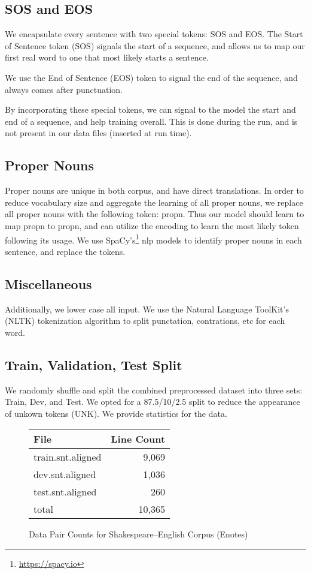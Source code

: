 \documentclass[twoside,twocolumn]{article}
\begin{document}
\subsection{SOS and EOS}
We encapsulate every sentence with two special tokens: SOS and EOS.
The Start of Sentence token (SOS) signals the start of a sequence, and allows
us to map our first real word to one that most likely starts a sentence.

We use the End of Sentence (EOS) token to signal the end of the sequence, and
always comes after punctuation.

By incorporating these special tokens, we can signal to the model the start and
end of a sequence, and help training overall. This is done during the run, and
is not present in our data files (inserted at run time).

\subsection{Proper Nouns}
Proper nouns are unique in both corpus, and have direct translations. In order
to reduce vocabulary size and aggregate the learning of all proper nouns,
we replace all proper nouns with the following token: propn. Thus our model
should learn to map propn to propn, and can utilize the encoding to learn the
most likely token following its usage. We use
SpaCy's\footnote{\url{https://spacy.io}} nlp models to identify
proper nouns in each sentence, and replace the tokens.

\subsection{Miscellaneous}
Additionally, we lower case all input. We use the Natural Language ToolKit's
(NLTK) tokenization algorithm
to split punctation, contrations, etc for each word.

\subsection{Train, Validation, Test Split}
We randomly shuffle and split the combined preprocessed dataset into three sets:
Train, Dev, and Test. We opted for a 87.5/10/2.5 split to reduce the appearance
of unkown tokens (UNK). We provide statistics for the data.
\begin{figure}[ht]
    \centering
    \begin{tabular}{ |l|r| }
        \hline
        \textbf{File}
          & \textbf{Line Count}\\
        \hline
        train.snt.aligned & 9,069 \\ \hline
        dev.snt.aligned & 1,036 \\ \hline
        test.snt.aligned & 260 \\ \hline
        total & 10,365 \\ \hline
    \end{tabular}

    \caption{Data Pair Counts for Shakespeare--English Corpus (Enotes)}
    \label{fig:data-lines-enotes}
\end{figure}
\end{document}
